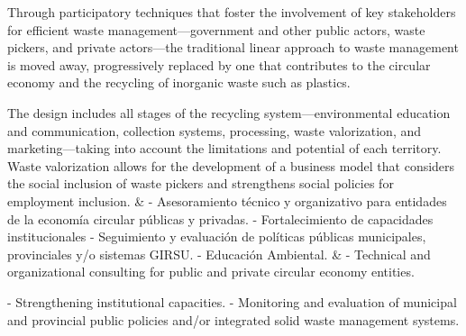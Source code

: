\documentclass[
  12pt,
  oneside]{book}
\begin{document}
\begin{landscape}
\begin{longtable*}[t]
Through participatory techniques that foster the involvement of key stakeholders for efficient waste management—government and other public actors, waste pickers, and private actors—the traditional linear approach to waste management is moved away, progressively replaced by one that contributes to the circular economy and the recycling of inorganic waste such as plastics.

The design includes all stages of the recycling system—environmental education and communication, collection systems, processing, waste valorization, and marketing—taking into account the limitations and potential of each territory. Waste valorization allows for the development of a business model that considers the social inclusion of waste pickers and strengthens social policies for employment inclusion. & -   Asesoramiento técnico y organizativo para entidades de la economía circular públicas y privadas.
-   Fortalecimiento de capacidades institucionales
-   Seguimiento y evaluación de políticas públicas municipales, provinciales y/o sistemas GIRSU.
-   Educación Ambiental. & - Technical and organizational consulting for public and private circular economy entities.

- Strengthening institutional capacities.
- Monitoring and evaluation of municipal and provincial public policies and/or integrated solid waste management systems.


\end{longtable*}
\end{landscape}
\end{document}
